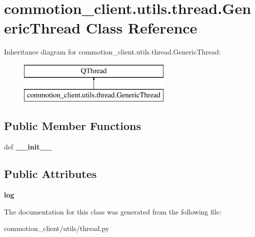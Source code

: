 \hypertarget{classcommotion__client_1_1utils_1_1thread_1_1GenericThread}{\section{commotion\-\_\-client.\-utils.\-thread.\-Generic\-Thread Class Reference}
\label{classcommotion__client_1_1utils_1_1thread_1_1GenericThread}
}
Inheritance diagram for commotion\-\_\-client.\-utils.\-thread.\-Generic\-Thread\-:\begin{figure}[H]
\begin{center}
\leavevmode
\includegraphics[height=2.000000cm]{classcommotion__client_1_1utils_1_1thread_1_1GenericThread}
\end{center}
\end{figure}
\subsection*{Public Member Functions}
\begin{DoxyCompactItemize}
\item 
\hypertarget{classcommotion__client_1_1utils_1_1thread_1_1GenericThread_a671a08f13469e8d618f36d84ce9cecbe}{def {\bfseries \-\_\-\-\_\-init\-\_\-\-\_\-}}\label{classcommotion__client_1_1utils_1_1thread_1_1GenericThread_a671a08f13469e8d618f36d84ce9cecbe}

\end{DoxyCompactItemize}
\subsection*{Public Attributes}
\begin{DoxyCompactItemize}
\item 
\hypertarget{classcommotion__client_1_1utils_1_1thread_1_1GenericThread_ad7535d8328a50a61385d8b5f58435f0c}{{\bfseries log}}\label{classcommotion__client_1_1utils_1_1thread_1_1GenericThread_ad7535d8328a50a61385d8b5f58435f0c}

\end{DoxyCompactItemize}


The documentation for this class was generated from the following file\-:\begin{DoxyCompactItemize}
\item 
commotion\-\_\-client/utils/thread.\-py\end{DoxyCompactItemize}
